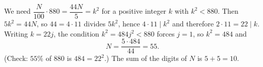 We need $\dfrac{N}{100}\cdot880=\dfrac{44N}{5}=k^2$ for a positive integer $k$ with $k^2<880$. Then $5k^2=44N$, so $44=4\cdot11$ divides $5k^2$, hence $4\cdot11\mid k^2$ and therefore $2\cdot11=22\mid k$. Writing $k=22j$, the condition $k^2=484j^2<880$ forces $j=1$, so $k^2=484$ and
\[N=\dfrac{5\cdot484}{44}=55.\]
(Check: $55\%$ of $880$ is $484=22^2$.) The sum of the digits of $N$ is $5+5=\boxed{10}$.
